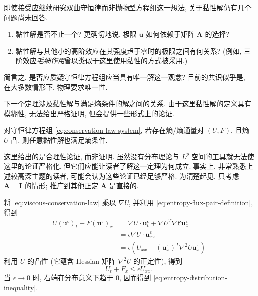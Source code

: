 即使接受应继续研究双曲守恒律而非抛物型方程组这一想法, 关于黏性解仍有几个问题尚未回答.
\begin{enumerate}
\item 黏性解是否不止一个? 更确切地说, 极限 $\bm{u}$ 如何依赖于矩阵 $\bm{A}$ 的选择?
\item 黏性解与其他小的高阶效应在其强度趋于零时的极限之间有何关系? (例如, 三阶效应\emph{毛细作用}曾以类似于这里使用黏性的方式被采用.)
\end{enumerate}
简言之, 是否应质疑守恒律方程组应当具有唯一解这一观念? 目前的共识似乎是, 在大多数情形下, 物理要求唯一性.

下一个定理涉及黏性解与满足熵条件的解之间的关系. 由于这里黏性解的定义具有模糊性, 无法给出严格证明, 但会提供一些形式上的论证.

\begin{Theorem}
\label{thm:viscosity-implies-entropy}
对守恒律方程组 \eqref{eq:conservation-law-system}, 若存在熵/熵通量对 $(U,F)$, 且熵 $U$ 凸, 则任意黏性解也满足熵条件.
\end{Theorem}

\begin{Proof}
这里给出的是合理性论证, 而非证明. 虽然没有分布理论与 $L^p$ 空间的工具就无法使这里的论证严格化, 但它们应能让读者了解这一定理为何成立. 事实上, 非常熟悉上述较高深主题的读者, 可能会认为这些论证已经足够严格. 为清楚起见, 只考虑 $\bm{A}=\bm{I}$ 的情形; 推广到其他正定 $\bm{A}$ 是直接的.

将 \eqref{eq:viscous-conservation-law} 乘以 $\nabla U$, 并利用 \eqref{eq:entropy-flux-pair-definition}, 得到
\[
\begin{aligned}
U(\bm{u}^\epsilon)_t+F(\bm{u}^\epsilon)_x
&=\nabla U\cdot\bm{u}_t^\epsilon+\nabla U^T\nabla\bm{f}\,\bm{u}_x^\epsilon\\
&=\epsilon\nabla U\cdot\bm{u}_{xx}^\epsilon\\
&=\epsilon(U_{xx}-(\bm{u}_x^\epsilon)^T\nabla^2U\bm{u}_x^\epsilon)
\end{aligned}
\]
利用 $U$ 的凸性 (它蕴含 Hessian 矩阵 $\nabla^2U$ 的正定性), 得到
\begin{equation}\label{eq:viscous-entropy-differential-inequality}
U_t+F_x\leq\epsilon U_{xx}.
\end{equation}
当 $\epsilon\to0$ 时, 右端在分布意义下趋于 $0$, 因而得到 \eqref{eq:entropy-distribution-inequality}.
\end{Proof}
